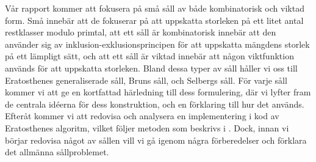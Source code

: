Vår rapport kommer att fokusera på små såll av både kombinatorisk och viktad form. 
Små innebär att de fokuserar på att uppskatta storleken på ett litet antal restklasser modulo primtal, att ett såll är kombinatorisk innebär att den använder sig av inklusion-exklusionsprincipen för att uppskatta mängdens storlek på ett lämpligt sätt, och att ett såll är viktad innebär att någon viktfunktion används för att uppskatta storleken. 
Bland dessa typer av såll håller vi oss till Eratosthenes generaliserade såll, Bruns såll, och Selbergs såll. 
För varje såll kommer vi att ge en kortfattad härledning till dess formulering, där vi lyfter fram de centrala idéerna för dess konstruktion, och en förklaring till hur det används. 
Efteråt kommer vi att redovisa och analysera en implementering i kod av Eratosthenes algoritm, vilket följer metoden som beskrivs i \cite{HaraldSieve}. 
Dock, innan vi börjar redovisa något av sållen vill vi gå igenom några förberedelser och förklara det allmänna sållproblemet.